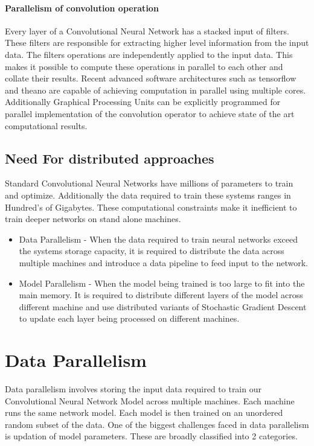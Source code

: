 \documentclass[sigconf]{acmart}
\begin{document}
\paragraph{\textbf{Parallelism of convolution operation}}

Every layer of a Convolutional Neural Network has a stacked input of filters. These filters are responsible for extracting higher level information from the input data. The filters operations are independently applied to the input data. This makes it possible to compute these operations in parallel to each other and collate their results. Recent advanced software architectures such as tensorflow and theano are capable of achieving computation in parallel using multiple cores. Additionally Graphical Processing Units can be explicitly programmed for parallel implementation of the convolution operator to achieve state of the art computational results.

\subsection{Need For distributed approaches}

Standard Convolutional Neural Networks have millions of parameters to train and optimize. Additionally the data required to train these systems ranges in Hundred's of Gigabytes. These computational constraints make it inefficient to train deeper networks on stand alone machines.

\begin{itemize}
\setlength\itemsep{1em}
\item Data Parallelism - When the data required to train neural networks exceed the systems storage capacity, it is required to distribute the data across multiple machines and introduce a data pipeline to feed input to the network.
\item Model Parallelism - When the model being trained is too large to fit into the main memory. It is required to distribute different layers of the model across different machine and use distributed variants of Stochastic Gradient Descent to update each layer being processed on different machines.  
\end{itemize}

\section{Data Parallelism} \label{data}

Data parallelism involves storing the input data required to train our Convolutional Neural Network Model across multiple machines. Each machine runs the same network model. Each model is then trained on an unordered random subset of the data. One of the biggest challenges faced in data parallelism is updation of model parameters. These are broadly classified into 2 categories.
\end{document}
